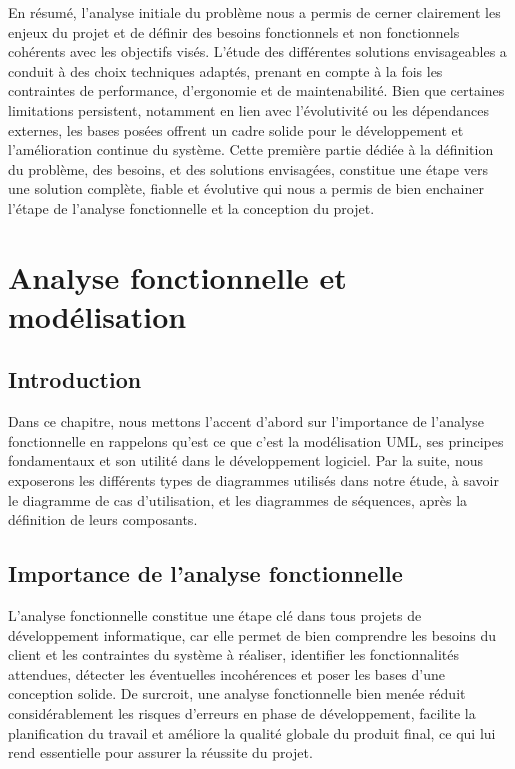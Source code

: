 \documentclass[12pt,a4paper]{report}
\begin{document}
	En résumé, l’analyse initiale du problème nous a permis de cerner clairement les enjeux du projet et de définir des besoins fonctionnels et non fonctionnels cohérents avec les objectifs visés. L’étude des différentes solutions envisageables a conduit à des choix techniques adaptés, prenant en compte à la fois les contraintes de performance, d’ergonomie et de maintenabilité. Bien que certaines limitations persistent, notamment en lien avec l’évolutivité ou les dépendances externes, les bases posées offrent un cadre solide pour le développement et l’amélioration continue du système. Cette première partie dédiée à la définition du problème, des besoins, et des solutions envisagées, constitue une étape vers une solution complète, fiable et évolutive qui nous a permis de bien enchainer l'étape de l'analyse fonctionnelle et la conception du projet.
	
	\chapter{Analyse fonctionnelle et modélisation}
	
	\section{Introduction}
	
	Dans ce chapitre, nous mettons l'accent d'abord sur l'importance de l'analyse fonctionnelle en rappelons qu'est ce que c'est la modélisation UML, ses principes fondamentaux et son utilité dans le développement logiciel. Par la suite, nous exposerons les différents types de diagrammes utilisés dans notre étude, à savoir le diagramme de cas d’utilisation, et les diagrammes de séquences, après la définition de leurs composants.
	
	\section{Importance de l'analyse fonctionnelle}
	
	L’analyse fonctionnelle constitue une étape clé dans tous projets de développement informatique, car elle permet de bien comprendre les besoins du client et les contraintes du système à réaliser, identifier les fonctionnalités attendues, détecter les éventuelles incohérences et poser les bases d’une conception solide. De surcroit, une analyse fonctionnelle bien menée réduit considérablement les risques d’erreurs en phase de développement, facilite la planification du travail et améliore la qualité globale du produit final, ce qui lui rend essentielle pour assurer la réussite du projet.
	
\end{document}
